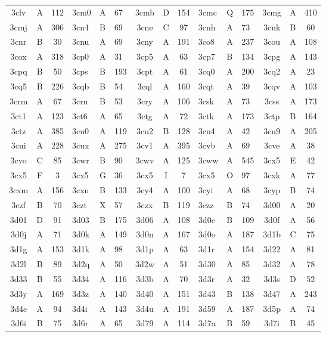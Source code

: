 \begin{longtable}{|c|c|c| a|a|a| c|c|c| a|a|a| c|c|c|}
3clv & A & 112 & 3cm0 & A & 67 & 3cmb & D & 154 & 3cmc & Q & 175 & 3cmg & A & 410\\
3cmj & A & 306 & 3cn4 & B & 69 & 3cne & C & 97 & 3cnh & A & 73 & 3cnk & B & 60\\
3cnr & B & 30 & 3cnu & A & 69 & 3cny & A & 191 & 3co8 & A & 237 & 3cou & A & 108\\
3cox & A & 318 & 3cp0 & A & 31 & 3cp5 & A & 63 & 3cp7 & B & 134 & 3cpg & A & 143\\
3cpq & B & 50 & 3cps & B & 193 & 3cpt & A & 61 & 3cq0 & A & 200 & 3cq2 & A & 23\\
3cq5 & B & 226 & 3cqb & B & 54 & 3cql & A & 160 & 3cqt & A & 39 & 3cqv & A & 103\\
3crm & A & 67 & 3crn & B & 53 & 3cry & A & 106 & 3csk & A & 73 & 3css & A & 173\\
3ct1 & A & 123 & 3ct6 & A & 65 & 3ctg & A & 72 & 3ctk & A & 173 & 3ctp & B & 164\\
3ctz & A & 385 & 3cu0 & A & 119 & 3cu2 & B & 128 & 3cu4 & A & 42 & 3cu9 & A & 205\\
3cui & A & 228 & 3cux & A & 275 & 3cv1 & A & 395 & 3cvb & A & 69 & 3cve & A & 38\\
3cvo & C & 85 & 3cwr & B & 90 & 3cwv & A & 125 & 3cww & A & 545 & 3cx5 & E & 42\\
3cx5 & F & 3 & 3cx5 & G & 36 & 3cx5 & I & 7 & 3cx5 & O & 97 & 3cxk & A & 77\\
3cxm & A & 156 & 3cxn & B & 133 & 3cy4 & A & 100 & 3cyi & A & 68 & 3cyp & B & 74\\
3czf & B & 70 & 3czt & X & 57 & 3czx & B & 119 & 3czz & B & 74 & 3d00 & A & 20\\
3d01 & D & 91 & 3d03 & B & 175 & 3d06 & A & 108 & 3d0c & B & 109 & 3d0f & A & 56\\
3d0j & A & 71 & 3d0k & A & 149 & 3d0n & A & 167 & 3d0o & A & 187 & 3d1b & C & 75\\
3d1g & A & 153 & 3d1k & A & 98 & 3d1p & A & 63 & 3d1r & A & 154 & 3d22 & A & 81\\
3d2l & B & 89 & 3d2q & A & 50 & 3d2w & A & 51 & 3d30 & A & 85 & 3d32 & A & 78\\
3d33 & B & 55 & 3d34 & A & 116 & 3d3b & A & 70 & 3d3r & A & 32 & 3d3s & D & 52\\
3d3y & A & 169 & 3d3z & A & 140 & 3d40 & A & 151 & 3d43 & B & 138 & 3d47 & A & 243\\
3d4e & A & 94 & 3d4i & A & 143 & 3d4u & A & 191 & 3d59 & A & 187 & 3d5p & A & 74\\
3d6i & B & 75 & 3d6r & A & 65 & 3d79 & A & 114 & 3d7a & B & 59 & 3d7i & B & 45\\

\end{longtable}
